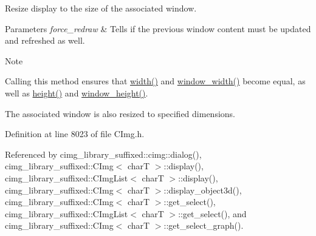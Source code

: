 Resize display to the size of the associated window. 


\begin{DoxyParams}{Parameters}
{\em force\+\_\+redraw} & Tells if the previous window content must be updated and refreshed as well. \\
\hline
\end{DoxyParams}
\begin{DoxyNote}{Note}

\begin{DoxyItemize}
\item Calling this method ensures that \hyperlink{structcimg__library__suffixed_1_1CImgDisplay_a7b08f09ace9b615eee0ff19846c4b6f8}{width()} and \hyperlink{structcimg__library__suffixed_1_1CImgDisplay_a7adf8a88e9cf55f7f394801df0a0e555}{window\+\_\+width()} become equal, as well as \hyperlink{structcimg__library__suffixed_1_1CImgDisplay_a5604a6886d51d1070ed2ddc568a848f2}{height()} and \hyperlink{structcimg__library__suffixed_1_1CImgDisplay_a3a9370e8b4fd2d50de38bdb5ac1a3ede}{window\+\_\+height()}.
\item The associated window is also resized to specified dimensions. 
\end{DoxyItemize}
\end{DoxyNote}


Definition at line 8023 of file C\+Img.\+h.



Referenced by cimg\+\_\+library\+\_\+suffixed\+::cimg\+::dialog(), cimg\+\_\+library\+\_\+suffixed\+::\+C\+Img$<$ char\+T $>$\+::display(), cimg\+\_\+library\+\_\+suffixed\+::\+C\+Img\+List$<$ char\+T $>$\+::display(), cimg\+\_\+library\+\_\+suffixed\+::\+C\+Img$<$ char\+T $>$\+::display\+\_\+object3d(), cimg\+\_\+library\+\_\+suffixed\+::\+C\+Img$<$ char\+T $>$\+::get\+\_\+select(), cimg\+\_\+library\+\_\+suffixed\+::\+C\+Img\+List$<$ char\+T $>$\+::get\+\_\+select(), and cimg\+\_\+library\+\_\+suffixed\+::\+C\+Img$<$ char\+T $>$\+::get\+\_\+select\+\_\+graph().

